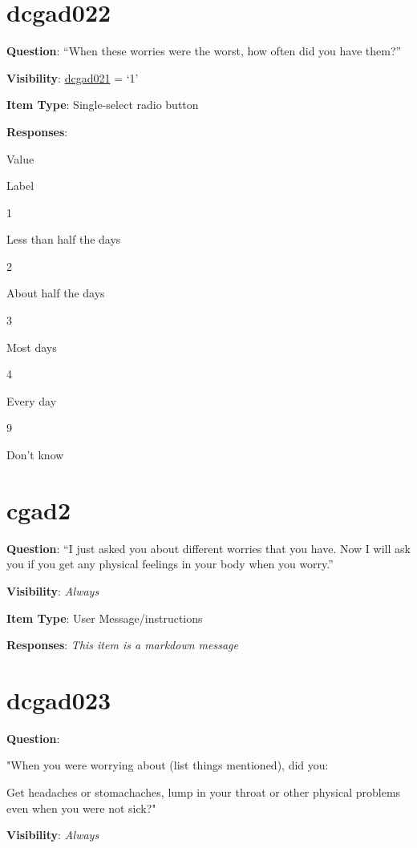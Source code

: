 \documentclass[]{book}
\begin{document}
\hypertarget{dcgad022}{%
\section{dcgad022}\label{dcgad022}}

\textbf{Question}: ``When these worries were the worst, how often did you have them?''

\textbf{Visibility}: \protect\hyperlink{dcgad021}{dcgad021} = `1'

\textbf{Item Type}: Single-select radio button

\textbf{Responses}:

Value

Label

1

Less than half the days

2

About half the days

3

Most days

4

Every day

9

Don't know

\hypertarget{cgad2}{%
\section{cgad2}\label{cgad2}}

\textbf{Question}: ``I just asked you about different worries that you have. Now I will ask you if you get any physical feelings in your body when you worry.''

\textbf{Visibility}: \emph{Always}

\textbf{Item Type}: User Message/instructions

\textbf{Responses}: \emph{This item is a markdown message}

\hypertarget{dcgad023}{%
\section{dcgad023}\label{dcgad023}}

\textbf{Question}:

"When you were worrying about (list things mentioned), did you:

Get headaches or stomachaches, lump in your throat or other physical problems even when you were not sick?"

\textbf{Visibility}: \emph{Always}
\end{document}
